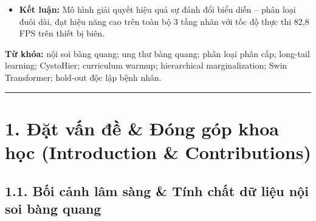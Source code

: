 \documentclass[
  10pt,
  a4paper,
  twocolumn]{article}
\providecommand{\tightlist}{%
  \setlength{\itemsep}{0pt}\setlength{\parskip}{0pt}}
\begin{document}
\begin{itemize}
\begin{itemize}
    \begin{itemize}
    \tightlist
    \item
      Binary AUROC: \textbf{0,9986 ± 0,0002} (KTC 95\%: {[}0,9984;
      0,9988{]}) \textbar{} Binary F1: \textbf{0,9811 ± 0,0036}
      \textbar{} Độ nhạy: \textbf{99,43\% ± 0,47\%} \textbar{} Độ đặc
      hiệu: \textbf{96,34\% ± 0,30\%}.
    \item
      Coarse Accuracy: \textbf{82,37\% ± 7,00\%} (đạt \textbf{86,42\% ±
      3,52\%} với Marginalization, KTC 95\%: {[}77,68\%; 95,16\%{]}).
    \item
      Fine Macro-F1 (Supported): \textbf{0,6450 ± 0,1105} (KTC 95\%:
      {[}0,3742; 0,9158{]}, \(p = 0{,}0478 < 0{,}05\) vs Multitask Swin)
      \textbar{} Fine Macro-F1 (All 22): \textbf{0,4691 ± 0,0804}
      \textbar{} Tính nhất quán Coarse-Fine: \textbf{89,52\% ± 3,80\%}.
    \end{itemize}
  \end{itemize}
\item
  \textbf{Kết luận:} Mô hình giải quyết hiệu quả sự đánh đổi biểu diễn
  -- phân loại đuôi dài, đạt hiệu năng cao trên toàn bộ 3 tầng nhãn với
  tốc độ thực thi 82,8 FPS trên thiết bị biên.
\end{itemize}

\textbf{Từ khóa:} nội soi bàng quang; ung thư bàng quang; phân loại phân
cấp; long-tail learning; CystoHier; curriculum warmup; hierarchical
marginalization; Swin Transformer; hold-out độc lập bệnh nhân.

\begin{center}\rule{0.5\linewidth}{0.5pt}\end{center}

\section{1. Đặt vấn đề \& Đóng góp khoa học (Introduction \&
Contributions)}\label{ux111ux1eb7t-vux1ea5n-ux111ux1ec1-ux111uxf3ng-guxf3p-khoa-hux1ecdc-introduction-contributions}

\subsection{1.1. Bối cảnh lâm sàng \& Tính chất dữ liệu nội soi bàng
quang}\label{bux1ed1i-cux1ea3nh-luxe2m-suxe0ng-tuxednh-chux1ea5t-dux1eef-liux1ec7u-nux1ed9i-soi-buxe0ng-quang}
\end{document}
